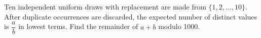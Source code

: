 Ten independent uniform draws with replacement are made from $\{1,2,\ldots,10\}$. After duplicate occurrences are discarded, the expected number of distinct values is $\dfrac{a}{b}$ in lowest terms. Find the remainder of $a+b$ modulo 1000.
